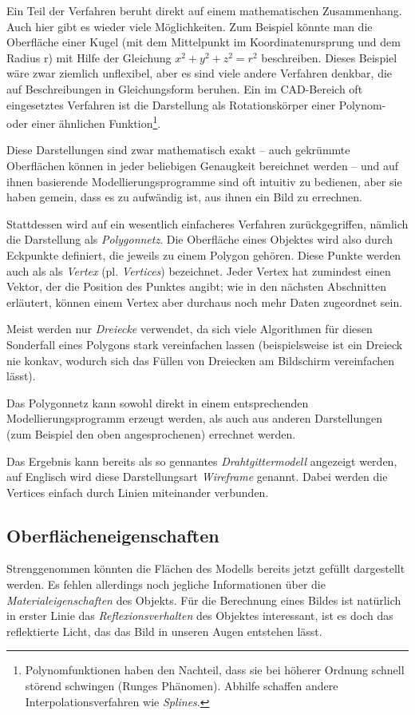 Ein Teil der Verfahren beruht direkt auf einem mathematischen Zusammenhang. Auch hier gibt es wieder viele Möglichkeiten. Zum Beispiel könnte man die Oberfläche einer Kugel (mit dem Mittelpunkt im Koordinatenursprung und dem Radius r) mit Hilfe der Gleichung $x^2 + y^2 + z^2 = r^2$ beschreiben. Dieses Beispiel wäre zwar ziemlich unflexibel, aber es sind viele andere Verfahren denkbar, die auf Beschreibungen in Gleichungsform beruhen. Ein im CAD-Bereich oft eingesetztes Verfahren ist die Darstellung als Rotationskörper einer Polynom- oder einer ähnlichen Funktion\footnote{Polynomfunktionen haben den Nachteil, dass sie bei höherer Ordnung schnell störend schwingen (Runges Phänomen). Abhilfe schaffen andere Interpolationsverfahren wie \emph{Splines}.}.

Diese Darstellungen sind zwar mathematisch exakt -- auch gekrümmte Oberflächen können in jeder beliebigen Genaugkeit bereichnet werden -- und auf ihnen basierende Modellierungsprogramme sind oft intuitiv zu bedienen, aber sie haben gemein, dass es zu aufwändig ist, aus ihnen ein Bild zu errechnen.

Stattdessen wird auf ein wesentlich einfacheres Verfahren zurückgegriffen, nämlich die Darstellung als \emph{Polygonnetz}. Die Oberfläche eines Objektes wird also durch Eckpunkte definiert, die jeweils zu einem Polygon gehören. Diese Punkte werden auch als als \emph{Vertex} (pl. \emph{Vertices}) bezeichnet. Jeder Vertex hat zumindest einen Vektor, der die Position des Punktes angibt; wie in den nächsten Abschnitten erläutert, können einem Vertex aber durchaus noch mehr Daten zugeordnet sein.

Meist werden nur \emph{Dreiecke} verwendet, da sich viele Algorithmen für diesen Sonderfall eines Polygons stark vereinfachen lassen (beispielsweise ist ein Dreieck nie konkav, wodurch sich das Füllen von Dreiecken am Bildschirm vereinfachen lässt).

Das Polygonnetz kann sowohl direkt in einem entsprechenden Modellierungsprogramm erzeugt werden, als auch aus anderen Darstellungen (zum Beispiel den oben angesprochenen) errechnet werden.

Das Ergebnis kann bereits als so gennantes \emph{Drahtgittermodell} angezeigt werden, auf Englisch wird diese Darstellungsart \emph{Wireframe} genannt. Dabei werden die Vertices einfach durch Linien miteinander verbunden.


\subsection{Oberflächeneigenschaften}
Strenggenommen könnten die Flächen des Modells bereits jetzt gefüllt dargestellt werden. Es fehlen allerdings noch jegliche Informationen über die \emph{Materialeigenschaften} des Objekts. Für die Berechnung eines Bildes ist natürlich in erster Linie das \emph{Reflexionsverhalten} des Objektes interessant, ist es doch das reflektierte Licht, das das Bild in unseren Augen entstehen lässt.

